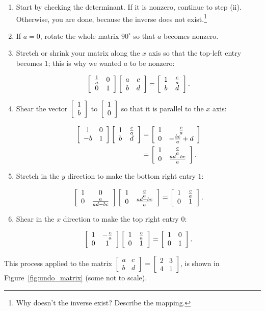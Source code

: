 \documentclass[../gatm.tex]{subfiles}
\begin{document}
\begin{enumerate}[label=\roman*.]
\item Start by checking the determinant. If it is nonzero, continue to step (ii). Otherwise, you are done, because the inverse does not exist.\footnote{Why doesn't the inverse exist? Describe the mapping.}
\setcounter{first_para}{\value{enumi}}
\item If $a=0$, rotate the whole matrix $90^\circ$ so that $a$ becomes nonzero.
\item Stretch or shrink your matrix along the $x$ axis so that the top-left entry becomes $1$; this is why we wanted $a$ to be nonzero:

$$\left[\begin{array}{cc} \frac{1}{a} & 0 \\ 0 & 1 \end{array}\right]\left[\begin{array}{cc} a & c \\ b & d \end{array}\right] = \left[\begin{array}{cc} 1 & \frac{c}{a} \\ b & d \end{array}\right].$$

\item Shear the vector $\left[\begin{array}{c} 1 \\ b \end{array}\right]$ to $\left[\begin{array}{c} 1 \\ 0 \end{array}\right]$ so that it is parallel to the $x$ axis:

\begin{align*}
\left[\begin{array}{cc} 1 & 0 \\ -b & 1 \end{array}\right]\left[\begin{array}{cc} 1 & \frac{c}{a} \\ b & d \end{array}\right] &= \left[\begin{array}{cc} 1 & \frac{c}{a} \\ 0 & -\frac{bc}{a}+d \end{array}\right] \\
&= \left[\begin{array}{cc} 1 & \frac{c}{a} \\ 0 & \frac{ad-bc}{a} \end{array}\right].
\end{align*}

\item Stretch in the $y$ direction to make the bottom right entry $1$:

$$\left[\begin{array}{cc} 1 & 0 \\ 0 & \frac{a}{ad-bc} \end{array}\right]\left[\begin{array}{cc} 1 & \frac{c}{a} \\ 0 & \frac{ad-bc}{a} \end{array}\right]=\left[\begin{array}{cc} 1 & \frac{c}{a} \\ 0 & 1 \end{array}\right].$$

\item Shear in the $x$ direction to make the top right entry $0$:

$$\left[\begin{array}{cc} 1 & -\frac{c}{a} \\ 0 & 1 \end{array}\right]\left[\begin{array}{cc} 1 & \frac{c}{a} \\ 0 & 1 \end{array}\right]=\left[\begin{array}{cc} 1 & 0 \\ 0 & 1 \end{array}\right].$$
\end{enumerate}

\noindent This process applied to the matrix $\left[\begin{array}{cc}a & c \\ b & d \end{array}\right]=\left[\begin{array}{cc}2 & 3 \\ 4 & 1 \end{array}\right]$, is shown in Figure~\ref{fig:undo_matrix} (some not to scale).
\end{document}
